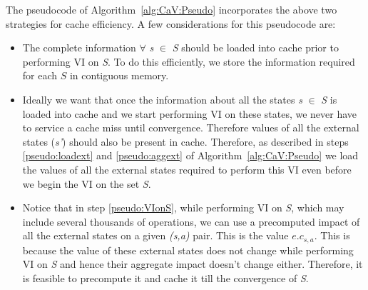 \documentclass[conference]{IEEEtran}
\begin{document}
The pseudocode of Algorithm~\ref{alg:CaV:Pseudo} incorporates the above two strategies for cache efficiency. A few considerations for this pseudocode are:

\begin{itemize}
\item The complete information $\forall$ \textit{s} $\in$ \textit{S} should be loaded into cache prior to performing VI on \textit{S}. To do this
efficiently, we store the information required for each $S$ in contiguous memory.

\item Ideally we want that once the information about all the states \textit{s} $\in$ \textit{S} is loaded into cache and we start performing VI on these states, we never have to service a cache miss until convergence. Therefore values of all the external states (\textit{s'}) should also be present in cache. Therefore, as described in steps \ref{pseudo:loadext} and \ref{pseudo:aggext} of Algorithm~\ref{alg:CaV:Pseudo} we load the values of all the external states required to perform this VI even before we begin the VI on the set \textit{S}.

\item Notice that in step \ref{pseudo:VIonS}, while performing VI on \textit{S}, which may include several thousands of operations, we can use a precomputed impact of all the external states on a given \textit{(s,a)} pair. This is the value \textit{$e.c_{s,a}$}. This is because the value of these external states does not change while performing VI on \textit{S} and hence their aggregate impact doesn't change either. Therefore, it is feasible to precompute it and cache it till the convergence of \textit{S}.
\end{itemize} 
\end{document}
